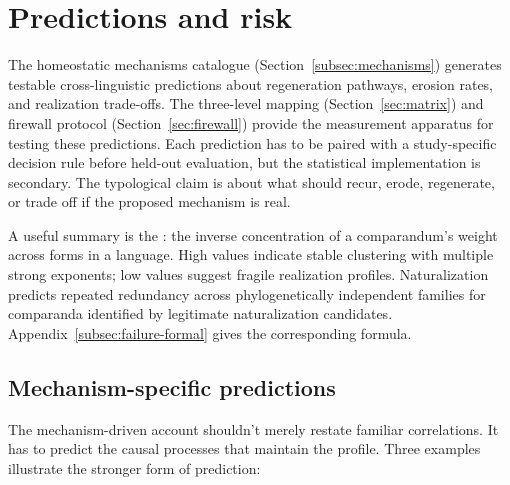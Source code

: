 \documentclass[12pt]{article}
\begin{document}
\section{Predictions and risk}\label{sec:predictions}
The homeostatic mechanisms catalogue (Section~\ref{subsec:mechanisms}) generates testable cross-linguistic predictions about regeneration pathways, erosion rates, and realization trade-offs. The three-level mapping (Section~\ref{sec:matrix}) and firewall protocol (Section~\ref{sec:firewall}) provide the measurement apparatus for testing these predictions. Each prediction has to be paired with a study-specific decision rule before held-out evaluation, but the statistical implementation is secondary. The typological claim is about what should recur, erode, regenerate, or trade off if the proposed mechanism is real.

A useful summary is the : the inverse concentration of a comparandum's weight across forms in a language. High values indicate stable clustering with multiple strong exponents; low values suggest fragile realization profiles. Naturalization predicts repeated redundancy across phylogenetically independent families for comparanda identified by legitimate naturalization candidates. Appendix~\ref{subsec:failure-formal} gives the corresponding formula.

\subsection{Mechanism-specific predictions}\label{subsec:mechanism-predictions}

The mechanism-driven account shouldn't merely restate familiar correlations. It has to predict the causal processes that maintain the profile. Three examples illustrate the stronger form of prediction:
\end{document}
